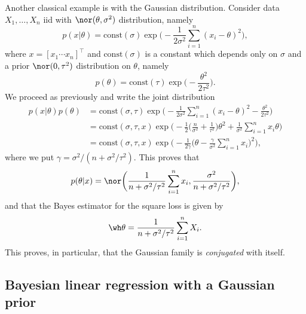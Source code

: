 Another classical example is with the Gaussian distribution.
Consider data $X_1, \ldots, X_n$ iid with $\nor(\theta, \sigma^2)$ distribution, namely
\begin{equation*}
	p(x | \theta) = \text{const}(\sigma) \exp\Big( - \frac{1}{2 \sigma^2} \sum_{i=1}^n 
	(x_i - \theta)^2 \Big),
\end{equation*}
where $x = [x_1 \cdots x_n]^\top$ and $\text{const}(\sigma)$ is a constant which depends only on $\sigma$ and a prior $\nor(0, \tau^2)$ distribution on $\theta$, namely
\begin{equation*}
	p(\theta) = \text{const}(\tau) \exp\Big(-\frac{\theta^2}{2 \tau^2} \Big).
\end{equation*}
We proceed as previously and write the joint distribution
\begin{align*}
	p(x | \theta) p(\theta) &= \text{const}(\sigma, \tau) \exp\Big( - \frac{1}{2 \sigma^2} 
	\sum_{i=1}^n (x_i - \theta)^2 - \frac{\theta^2}{2 \tau^2} \Big) \\
	&= \text{const}(\sigma, \tau, x) \exp \bigg ( - \frac 12 \Big( \frac{n}{\sigma^2} + \frac{1}{\tau^2} \Big) \theta^2 + \frac{1}{\sigma^2} \sum_{i=1}^n x_i \theta  \bigg) \\
	&= \text{const}(\sigma, \tau, x) \exp \bigg( - \frac{1}{2 \gamma} \Big(\theta - \frac{\gamma}{\sigma^2} \sum_{i=1}^n x_i \Big)^2 \bigg),
\end{align*}
where we put $\gamma = \sigma^2 / (n + \sigma^2 / \tau^2)$.
This proves that
\begin{equation*}
	p(\theta | x) = \nor \bigg( \frac{1}{n + \sigma^2 / \tau^2} \sum_{i=1}^n x_i, \frac{\sigma^2}{n + \sigma^2 / \tau^2} \bigg),
\end{equation*}
and that the Bayes estimator for the square loss is given by
\begin{equation*}
	\wh \theta = \frac{1}{n + \sigma^2 / \tau^2} \sum_{i=1}^n X_i.
\end{equation*}
This proves, in particular, that the Gaussian family is \emph{conjugated} with itself.


\subsection{Bayesian linear regression with a Gaussian prior} %
\label{sub:bayesian-linear-regression}

